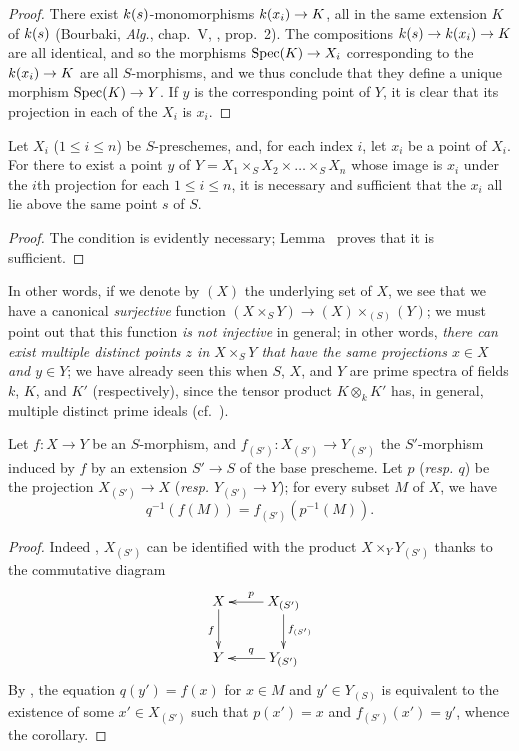\begin{proof}
\label{proof-1.3.4.6}
There exist $k(s)$-monomorphisms $\kres(x_i)\to K$, all in the same extension $K$ of $k(s)$ (Bourbaki, \emph{Alg.}, chap.~V, , prop.~2).
The compositions $\kres(s)\to\kres(x_i)\to K$ are all identical, and so the morphisms $\Spec(K)\to X_i$ corresponding to the $\kres(x_i)\to K$ are all $S$-morphisms, and we thus conclude that they define a unique morphism $\Spec(K)\to Y$.
If $y$ is the corresponding point of $Y$, it is clear that its projection in each of the $X_i$ is $x_i$.
\end{proof}

\begin{prop}[3.4.7]
\label{1.3.4.7}
Let $X_i$ ($1\leq i\leq n$) be $S$-preschemes, and, for each index $i$, let $x_i$ be a point of $X_i$.
For there to exist a point $y$ of $Y=X_1\times_S X_2\times\ldots\times_S X_n$ whose image is $x_i$ under the $i$th projection for each $1\leq i\leq n$, it is necessary and sufficient that the $x_i$ all lie above the same point $s$ of $S$.
\end{prop}

\begin{proof}
\label{proof-1.3.4.7}
The condition is evidently necessary; Lemma~ proves that it is sufficient.
\end{proof}

In other words, if we denote by $(X)$ the underlying set of $X$, we see that we have a canonical \emph{surjective} function $(X\times_S Y)\to(X)\times_{(S)}(Y)$; we must point out that this function \emph{is not injective} in general; in other words, \emph{there can exist multiple distinct points $z$ in $X\times_S Y$ that have the same projections $x\in X$ and $y\in Y$}; we have already seen this when $S$, $X$, and $Y$ are prime spectra of fields $k$, $K$, and $K'$ (respectively), since the tensor product $K\otimes_k K'$ has, in general, multiple distinct prime ideals (cf.~).

\begin{cor}[3.4.8]
\label{1.3.4.8}
Let $f:X\to Y$ be an $S$-morphism, and $f_{(S')}:X_{(S')}\to Y_{(S')}$ the $S'$-morphism induced by $f$ by an extension $S'\to S$ of the base prescheme.
Let $p$ (\emph{resp. $q$}) be the projection $X_{(S')}\to X$ (\emph{resp. $Y_{(S')}\to Y$}); for every subset $M$ of $X$, we have
\[
  q^{-1}(f(M))=f_{(S')}(p^{-1}(M)).
\]
\end{cor}

\begin{proof}
\label{proof-1.3.4.8}
Indeed , $X_{(S')}$ can be identified with the product $X\times_Y Y_{(S')}$ thanks to the commutative diagram
\[
  \xymatrix{
    X\ar[d]_f &
    X_{(S')}\ar[l]_p\ar[d]^{f_{(S')}}\\
    Y &
    Y_{(S')}\ar[l]_q
  }
\]
By , the equation $q(y')=f(x)$ for $x\in M$ and $y'\in Y_{(S)}$ is equivalent to the existence of some $x'\in X_{(S')}$ such that $p(x')=x$ and $f_{(S')}(x')=y'$, whence the corollary.
\end{proof}

